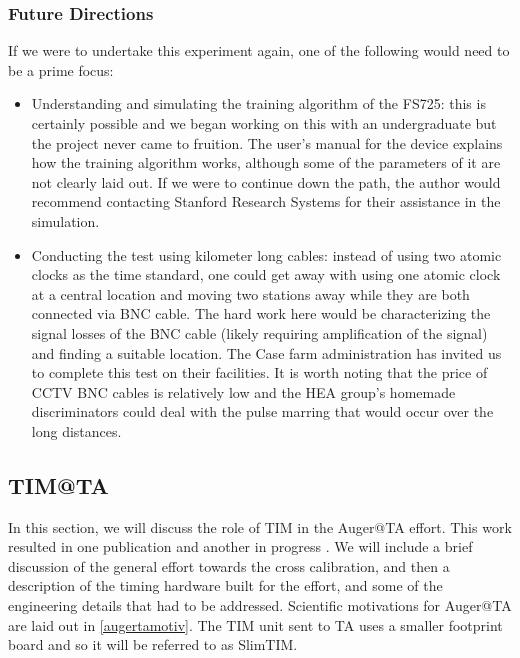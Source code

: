 \subsubsection{Future Directions}
\label{futdir}
If we were to undertake this experiment again, one of the following would need to be a prime focus:
\begin{itemize}
	\item Understanding and simulating the training algorithm of the FS725: this is certainly possible and we began working on this with an undergraduate but the project never came to fruition. The user's manual for the device explains how the training algorithm works, although some of the parameters of it are not clearly laid out. If we were to continue down the path, the author would recommend contacting Stanford Research Systems for their assistance in the simulation.
	\item Conducting the test using kilometer long cables: instead of using two atomic clocks as the time standard, one could get away with using one atomic clock at a central location and moving two stations away while they are both connected via BNC cable. The hard work here would be characterizing the signal losses of the BNC cable (likely requiring amplification of the signal) and finding a suitable location. The Case farm administration has invited us to complete this test on their facilities. It is worth noting that the price of CCTV BNC cables is relatively low and the HEA group's homemade discriminators could deal with the pulse marring that would occur over the long distances. 
\end{itemize}

\subsection{TIM@TA}

\label{augeratta}
In this section, we will discuss the role of TIM in the Auger@TA effort. This work resulted in one publication and another in progress \cite{augerta1}. We will include a brief discussion of the general effort towards the cross calibration, and then a description of the timing hardware built for the effort, and some of the engineering details that had to be addressed. Scientific motivations for Auger@TA are laid out in \autoref{augertamotiv}. The TIM unit sent to TA uses a smaller footprint board and so it will be referred to as SlimTIM. 

